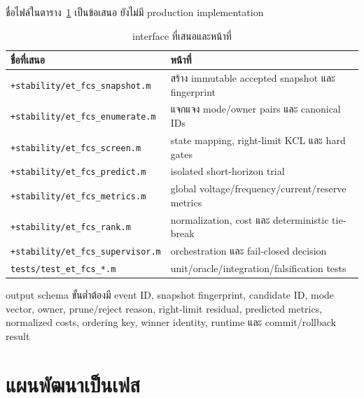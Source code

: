 \documentclass[12pt,a4paper]{article}
\begin{document}
ชื่อไฟล์ในตาราง~\ref{tab:interfaces} เป็นข้อเสนอ ยังไม่มี production implementation

\begin{table}[H]
\centering
\caption{interface ที่เสนอและหน้าที่}
\label{tab:interfaces}
\begin{tabularx}{\textwidth}{>{\raggedright\arraybackslash}p{}X}
\toprule
ชื่อที่เสนอ & หน้าที่ \\
\midrule
\texttt{+stability/et\_fcs\_snapshot.m} & สร้าง immutable accepted snapshot และ fingerprint \\
\texttt{+stability/et\_fcs\_enumerate.m} & แจกแจง mode/owner pairs และ canonical IDs \\
\texttt{+stability/et\_fcs\_screen.m} & state mapping, right-limit KCL และ hard gates \\
\texttt{+stability/et\_fcs\_predict.m} & isolated short-horizon trial \\
\texttt{+stability/et\_fcs\_metrics.m} & global voltage/frequency/current/reserve metrics \\
\texttt{+stability/et\_fcs\_rank.m} & normalization, cost และ deterministic tie-break \\
\texttt{+stability/et\_fcs\_supervisor.m} & orchestration และ fail-closed decision \\
\texttt{tests/test\_et\_fcs\_*.m} & unit/oracle/integration/falsification tests \\
\bottomrule
\end{tabularx}
\end{table}

output schema ขั้นต่ำต้องมี event ID, snapshot fingerprint, candidate ID, mode vector, owner,
prune/reject reason, right-limit residual, predicted metrics, normalized costs, ordering key,
winner identity, runtime และ commit/rollback result

\section{แผนพัฒนาเป็นเฟส}
\end{document}

